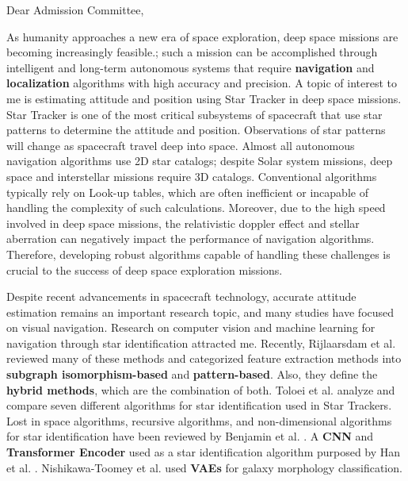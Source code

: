 \documentclass[a4,10pt]{article}
\begin{document}
\begin{large} 
Dear Admission Committee, \par
\vspace{-0.25cm} \quad As humanity approaches a new era of space exploration, deep space missions are becoming increasingly feasible.; such a mission can be accomplished through intelligent and long-term autonomous systems that require \textbf{navigation} and \textbf{localization} algorithms with high accuracy and precision. A topic of interest to me is estimating attitude and position using Star Tracker in deep space missions. Star Tracker is one of the most critical subsystems of spacecraft that use star patterns to determine the attitude and position. Observations of star patterns will change as spacecraft travel deep into space\cite{bailer2021lost}. Almost all autonomous navigation algorithms use 2D star catalogs; despite Solar system missions\cite{hallock2017acs}, deep space and interstellar missions require 3D catalogs. Conventional algorithms typically rely on Look-up tables, which are often inefficient or incapable of handling the complexity of such calculations. Moreover, due to the high speed involved in deep space missions, the relativistic doppler effect and stellar aberration can negatively impact the performance of navigation algorithms. Therefore, developing robust algorithms capable of handling these challenges is crucial to the success of deep space exploration missions.\par
\quad Despite recent advancements in spacecraft technology, accurate attitude estimation remains an important research topic, and many studies have focused on visual navigation. Research on computer vision and machine learning for navigation through star identification attracted me. 
Recently, Rijlaarsdam et al. \cite{rijlaarsdam2020survey} reviewed many of these methods and categorized feature extraction methods into  \textbf{subgraph isomorphism-based} and  \textbf{pattern-based}. Also, they define the  \textbf{hybrid methods}, which are the combination of both. Toloei et al. \cite{toloei2020comparative} analyze and compare seven different algorithms for star identification used in Star Trackers. Lost in space algorithms, recursive algorithms, and non-dimensional algorithms for star identification have been reviewed by Benjamin et al. \cite{spratling2009survey}. A  \textbf{CNN} and  \textbf{Transformer Encoder} used as a star identification algorithm purposed by Han et al. \cite {han2021end}. Nishikawa-Toomey et al. \cite{nishikawa2020semi} used  \textbf{VAEs} for galaxy morphology classification. 

\end{large}
\end{document}
